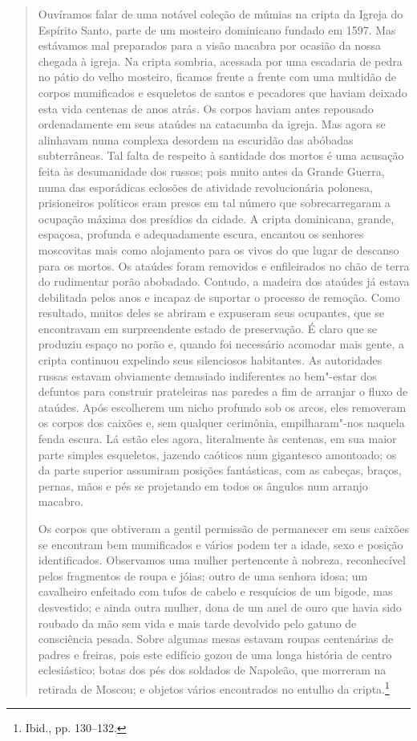 \begin{quote}
Ouvíramos falar de uma notável coleção de múmias na cripta da Igreja do
Espírito Santo, parte de um mosteiro dominicano fundado em 1597. Mas
estávamos mal preparados para a visão macabra por ocasião da nossa
chegada à igreja. Na cripta sombria, acessada por uma escadaria de pedra
no pátio do velho mosteiro, ficamos frente a frente com uma multidão de
corpos mumificados e esqueletos de santos e pecadores que haviam deixado
esta vida centenas de anos atrás. Os corpos haviam antes repousado
ordenadamente em seus ataúdes na catacumba da igreja. Mas agora se
alinhavam numa complexa desordem na escuridão das abóbadas subterrâneas.
Tal falta de respeito à santidade dos mortos é uma acusação feita às
desumanidade dos russos; pois muito antes da Grande Guerra, numa das
esporádicas eclosões de atividade revolucionária polonesa, prisioneiros
políticos eram presos em tal número que sobrecarregaram a ocupação
máxima dos presídios da cidade. A cripta dominicana, grande, espaçosa,
profunda e adequadamente escura, encantou os senhores moscovitas mais
como alojamento para os vivos do que lugar de descanso para os mortos.
Os ataúdes foram removidos e enfileirados no chão de terra do rudimentar
porão abobadado. Contudo, a madeira dos ataúdes já estava debilitada
pelos anos e incapaz de suportar o processo de remoção. Como resultado,
muitos deles se abriram e expuseram seus ocupantes, que se encontravam
em surpreendente estado de preservação. É claro que se produziu espaço
no porão e, quando foi necessário acomodar mais gente, a cripta
continuou expelindo seus silenciosos habitantes. As autoridades russas
estavam obviamente demasiado indiferentes ao bem"-estar dos defuntos para
construir prateleiras nas paredes a fim de arranjar o fluxo de ataúdes.
Após escolherem um nicho profundo sob os arcos, eles removeram os corpos
dos caixões e, sem qualquer cerimônia, empilharam"-nos naquela fenda
escura. Lá estão eles agora, literalmente às centenas, em sua maior
parte simples esqueletos, jazendo caóticos num gigantesco amontoado; os
da parte superior assumiram posições fantásticas, com as cabeças,
braços, pernas, mãos e pés se projetando em todos os ângulos num arranjo
macabro.

Os corpos que obtiveram a gentil permissão de permanecer em seus caixões
se encontram bem mumificados e vários podem ter a idade, sexo e posição
identificados. Observamos uma mulher pertencente à nobreza, reconhecível
pelos fragmentos de roupa e jóias; outro de uma senhora idosa; um
cavalheiro enfeitado com tufos de cabelo e resquícios de um bigode, mas
desvestido; e ainda outra mulher, dona de um anel de ouro que havia sido
roubado da mão sem vida e mais tarde devolvido pelo gatuno de
consciência pesada. Sobre algumas mesas estavam roupas centenárias de
padres e freiras, pois este edifício gozou de uma longa história de
centro eclesiástico; botas dos pés dos soldados de Napoleão, que
morreram na retirada de Moscou; e objetos vários encontrados no entulho
da cripta.\footnote{Ibid., pp. 130--132.}
\end{quote}

